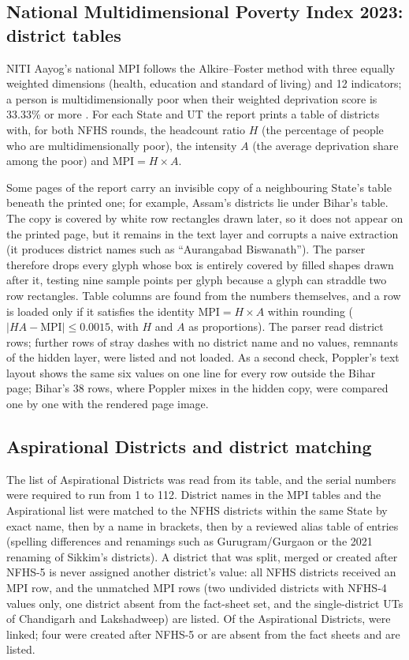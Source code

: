 \documentclass[11pt,a4paper]{article}
\begin{document}
\subsection{National Multidimensional Poverty Index 2023: district tables}
NITI Aayog's national MPI follows the Alkire--Foster method \citep{alkire2011counting} with three equally weighted dimensions (health, education and standard of living) and 12 indicators; a person is multidimensionally poor when their weighted deprivation score is 33.33\% or more \citep{niti2023mpi}. For each State and UT the report prints a table of districts with, for both NFHS rounds, the headcount ratio $H$ (the percentage of people who are multidimensionally poor), the intensity $A$ (the average deprivation share among the poor) and $\mathrm{MPI} = H \times A$.

Some pages of the report carry an invisible copy of a neighbouring State's table beneath the printed one; for example, Assam's districts lie under Bihar's table. The copy is covered by white row rectangles drawn later, so it does not appear on the printed page, but it remains in the text layer and corrupts a naive extraction (it produces district names such as ``Aurangabad Biswanath''). The parser therefore drops every glyph whose box is entirely covered by filled shapes drawn after it, testing nine sample points per glyph because a glyph can straddle two row rectangles. Table columns are found from the numbers themselves, and a row is loaded only if it satisfies the identity $\mathrm{MPI} = H \times A$ within rounding ($|HA - \mathrm{MPI}| \le 0.0015$, with $H$ and $A$ as proportions). The parser read \mpiRows{} district rows; \mpiStray{} further rows of stray dashes with no district name and no values, remnants of the hidden layer, were listed and not loaded. As a second check, Poppler's text layout shows the same six values on one line for every row outside the Bihar page; Bihar's 38 rows, where Poppler mixes in the hidden copy, were compared one by one with the rendered page image.

\subsection{Aspirational Districts and district matching}
The list of Aspirational Districts was read from its table, and the serial numbers were required to run from 1 to 112. District names in the MPI tables and the Aspirational list were matched to the NFHS districts within the same State by exact name, then by a name in brackets, then by a reviewed alias table of \mpiAliases{} entries (spelling differences and renamings such as Gurugram/Gurgaon or the 2021 renaming of Sikkim's districts). A district that was split, merged or created after NFHS-5 is never assigned another district's value: all \nDistricts{} NFHS districts received an MPI row, and the \mpiUnmatched{} unmatched MPI rows (two undivided districts with NFHS-4 values only, one district absent from the fact-sheet set, and the single-district UTs of Chandigarh and Lakshadweep) are listed. Of the \aspListed{} Aspirational Districts, \aspMatched{} were linked; four were created after NFHS-5 or are absent from the fact sheets and are listed.
\end{document}
